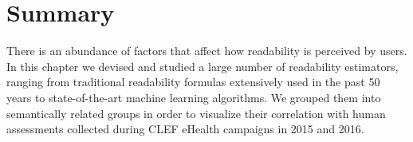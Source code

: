 \documentclass[runningheads,a4paper]{llncs}
\begin{document}

%



\section{Summary}
\label{sec:conclusion_doc_analysis}

There is an abundance of factors that affect how readability is perceived by users. 
In this chapter we devised and studied a large number of readability estimators, ranging from traditional readability formulas extensively used in the past 50 years to state-of-the-art machine learning algorithms.
We grouped them into semantically related groups in order to visualize their correlation with human assessments collected during CLEF eHealth campaigns in 2015 and 2016.
\end{document}
